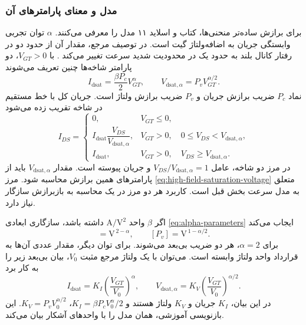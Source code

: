 \subsubsection*{مدل  و معنای پارامترهای آن}
برای برازش ساده‌تر منحنی‌ها، کتاب و اسلاید ۱۱ مدل 
را معرفی می‌کنند. \(\alpha\) توان تجربی وابستگی جریان به اضافه‌ولتاژ گیت
است. در توصیف مرجع، مقدار آن از حدود دو در رفتار کانال بلند به حدود یک
در محدودیت شدید سرعت تغییر می‌کند
\cite[روابط  و ]{weste}\cite[اسلایدهای ۱۰ و ۱۱]{nonideal}.
با \(V_{GT}>0\)، دو پارامتر شاخه‌ها چنین تعریف می‌شوند
\begin{equation}
 I_{\mathrm{dsat}}=\frac{\beta P_c}{2}V_{GT}^{\alpha},\qquad
 V_{\mathrm{dsat},\alpha}=P_vV_{GT}^{\alpha/2}.
 \label{eq:alpha-parameters}
\end{equation}
نماد \(P_c\) ضریب برازش جریان و \(P_v\) ضریب برازش ولتاژ است. جریان
کل با خط مستقیم در شاخه  تقریب زده می‌شود
\begin{equation}
 I_{DS}=\begin{cases}
 0,&V_{GT}\le0,\\[2pt]
 I_{\mathrm{dsat}}\dfrac{V_{DS}}{V_{\mathrm{dsat},\alpha}},
 &V_{GT}>0,\quad 0\le V_{DS}<V_{\mathrm{dsat},\alpha},\\[5pt]
 I_{\mathrm{dsat}},&V_{GT}>0,\quad V_{DS}\ge V_{\mathrm{dsat},\alpha}.
 \end{cases}
 \label{eq:alpha-piecewise}
\end{equation}
در مرز دو شاخه، عامل \(V_{DS}/V_{\mathrm{dsat},\alpha}=1\) و جریان
پیوسته است. مقدار \(V_{\mathrm{dsat},\alpha}\) باید از پارامترهای همین
برازش محاسبه شود. مرز \eqref{eq:high-field-saturation-voltage} متعلق به
مدل سرعت بخش قبل است. کاربرد هر دو مرز در یک محاسبه به بازبرازش سازگار
نیاز دارد.

اگر \(\beta\) واحد \(\unit{\ampere\per\volt\squared}\) داشته باشد،
سازگاری ابعادی \eqref{eq:alpha-parameters} ایجاب می‌کند
\begin{equation}
 [P_c]=\mathrm{V}^{\,2-\alpha},\qquad
 [P_v]=\mathrm{V}^{\,1-\alpha/2}.
 \label{eq:alpha-dimensions}
\end{equation}
برای \(\alpha=2\)، هر دو ضریب بی‌بعد می‌شوند. برای توان دیگر، مقدار عددی
آن‌ها به قرارداد واحد ولتاژ وابسته است. می‌توان با یک ولتاژ مرجع مثبت
\(V_0\)، بیان بی‌بعد زیر را به کار برد
\begin{equation}
 I_{\mathrm{dsat}}=K_I\left(\frac{V_{GT}}{V_0}\right)^\alpha,\qquad
 V_{\mathrm{dsat},\alpha}=K_V
 \left(\frac{V_{GT}}{V_0}\right)^{\alpha/2}.
 \label{eq:alpha-normalized}
\end{equation}
در این بیان، \(K_I\) جریان و \(K_V\) ولتاژ هستند و
\(K_I=\beta P_cV_0^\alpha/2\)، \(K_V=P_vV_0^{\alpha/2}\).
این بازنویسی آموزشی، همان مدل را با واحدهای آشکار بیان می‌کند.

